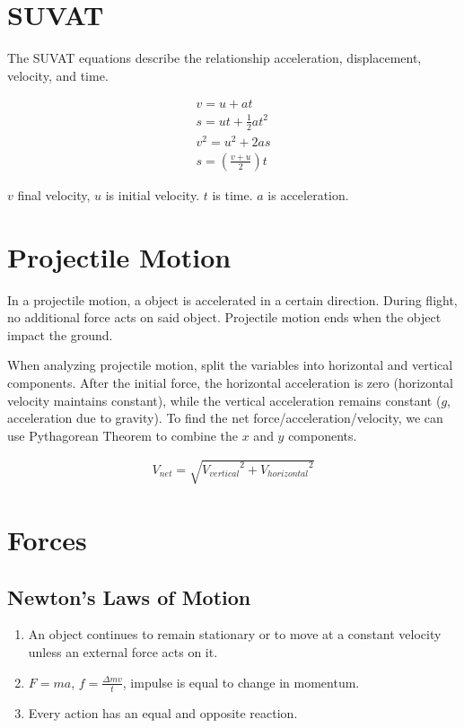 \documentclass[../notes.tex]{subfiles}
\begin{document}
\section{SUVAT}
The SUVAT equations describe the relationship acceleration, displacement, velocity, and time.

\begin{align}
	v = u + at \\
	s = ut + \frac{1}{2}at^2 \\
	v^2 = u^2 + 2as \\
	s = (\frac{v+u}{2})t
\end{align} 

$v$ final velocity, $u$ is initial velocity.
$t$ is time.
$a$ is acceleration.

\section{Projectile Motion}
In a projectile motion, a object is accelerated in a certain direction.
During flight, no additional force acts on said object.
Projectile motion ends when the object impact the ground.

When analyzing projectile motion, split the variables into horizontal and vertical components.
After the initial force, the horizontal acceleration is zero (horizontal velocity maintains constant), while the vertical acceleration remains constant ($g$, acceleration due to gravity).
To find the net force/acceleration/velocity, we can use Pythagorean Theorem to combine the $x$ and $y$ components.

\begin{align*}
	V_{net} = \sqrt{{V_{vertical}}^2 + {V_{horizontal}}^2}
\end{align*} 

\section{Forces}

\subsection{Newton's Laws of Motion}
\begin{enumerate}
	\item An object continues to remain stationary or to move at a constant velocity unless an external force acts on it.
	\item $F=ma$,  $f = \frac{\Delta mv}{t}$, impulse is equal to change in momentum.
	\item Every action has an equal and opposite reaction.
\end{enumerate}
\end{document}
